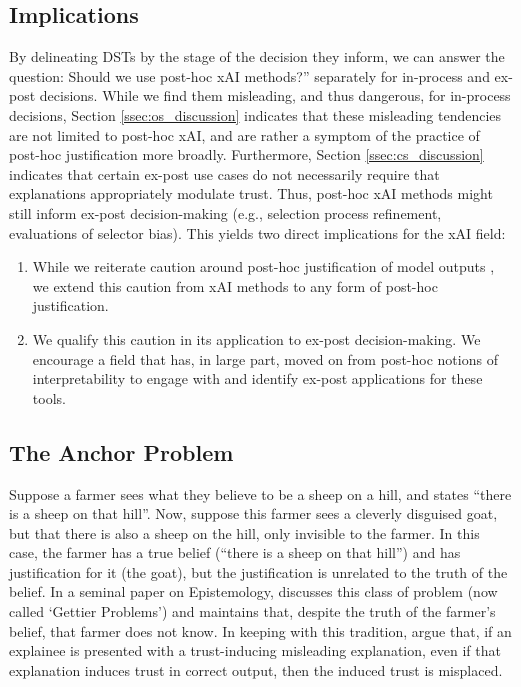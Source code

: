 \subsection{Implications}
By delineating DSTs by the stage of the decision they inform, we can answer the question: Should we use post-hoc xAI methods?'' separately for in-process and ex-post decisions. While we find them misleading, and thus dangerous, for in-process decisions, Section \ref{ssec:os_discussion} indicates that these misleading tendencies are not limited to post-hoc xAI, and are rather a symptom of the practice of post-hoc justification more broadly. Furthermore, Section \ref{ssec:cs_discussion} indicates that certain ex-post use cases do not necessarily require that explanations appropriately modulate trust. Thus, post-hoc xAI methods might still inform ex-post decision-making (e.g., selection process refinement, evaluations of selector bias). This yields two direct implications for the xAI field:

\begin{enumerate}
    \item While we reiterate caution around post-hoc justification of model outputs \cite{miller_explainable_2023, Lipton, bansal_does_2021, ford_play_2020, jacobs_how_2021}, we extend this caution from xAI methods to any form of post-hoc justification.
    \item We qualify this caution in its application to ex-post decision-making. We encourage a field that has, in large part, moved on from post-hoc notions of interpretability \cite{kumar_problems_2020,barocas_hidden_2020,Lipton,karimi_algorithmic_2021} to engage with and identify ex-post applications for these tools.
\end{enumerate}

\subsection{The Anchor Problem}\label{ssec:anchor_problem}
Suppose a farmer sees what they believe to be a sheep on a hill, and states ``there is a sheep on that hill''. Now, suppose this farmer sees a cleverly disguised goat, but that there is also a sheep on the hill, only invisible to the farmer. In this case, the farmer has a true belief (``there is a sheep on that hill'') and has justification for it (the goat), but the justification is unrelated to the truth of the belief. In a seminal paper on Epistemology, \textcite{Gettier_1963} discusses this class of problem (now called `Gettier Problems') and maintains that, despite the truth of the farmer's belief, that farmer does not know. In keeping with this tradition, \textcite{Cabitza_Fregosi_Campagner_Natali_2024} argue that, if an explainee is presented with a trust-inducing misleading explanation, even if that explanation induces trust in correct output, then the induced trust is misplaced.

